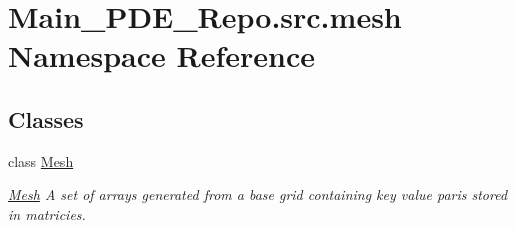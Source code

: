 \hypertarget{namespaceMain__PDE__Repo_1_1src_1_1mesh}{}\section{Main\+\_\+\+P\+D\+E\+\_\+\+Repo.\+src.\+mesh Namespace Reference}
\label{namespaceMain__PDE__Repo_1_1src_1_1mesh}
\subsection*{Classes}
\begin{DoxyCompactItemize}
\item 
class \hyperlink{classMain__PDE__Repo_1_1src_1_1mesh_1_1Mesh}{Mesh}
\begin{DoxyCompactList}\small\item\em \hyperlink{classMain__PDE__Repo_1_1src_1_1mesh_1_1Mesh}{Mesh} A set of arrays generated from a base grid containing key value paris stored in matricies. \end{DoxyCompactList}\end{DoxyCompactItemize}
